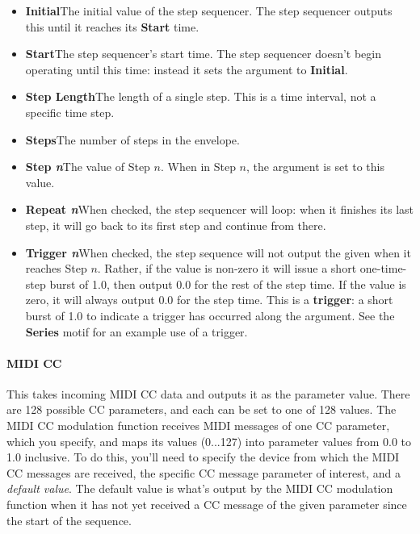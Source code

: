 \documentclass[twoside,10pt]{article}
\begin{document}
\begin{itemize}
\item {\bf Initial}\qquad The initial value of the step sequencer.   The step sequencer outputs this until it reaches its {\bf Start} time.
\item {\bf Start}\qquad The step sequencer's start time.  The step sequencer doesn't begin operating until this time: instead it sets the argument to {\bf Initial}.
\item {\bf Step Length}\qquad The length of a single step.  This is a time interval, not a specific time step.
\item {\bf Steps}\qquad The number of steps in the envelope.
\item {\bf Step \textit{n}}\qquad The value of Step \(n\).  When in Step \(n\), the argument is set to this value.
\item {\bf Repeat \textit{n}}\qquad When checked, the step sequencer will loop: when it finishes its last step, it will go back to its first step and continue from there.
\item {\bf Trigger \textit{n}}\qquad When checked, the step sequence will not output the given when it reaches Step \(n\).  Rather, if the value is non-zero it will issue a short one-time-step burst of 1.0, then output 0.0 for the rest of the step time.  If the value is zero, it will always output 0.0 for the step time.  This is a {\bf trigger}: a short burst of 1.0 to indicate a trigger has occurred along the argument.  See the {\bf Series} motif for an example use of a trigger.
\end{itemize}

\paragraph{MIDI CC}

This takes incoming MIDI CC data and outputs it as the parameter value.  There are 128 possible CC parameters, and each can be set to one of 128 values.  The MIDI CC modulation function receives MIDI messages of one CC parameter, which you specify, and maps its values (0...127) into parameter values from 0.0 to 1.0 inclusive.  To do this, you'll need to specify the device from which the MIDI CC messages are received, the specific CC message parameter of interest, and a {\it default value}.  The default value is what's output by the MIDI CC modulation function when it has not yet received a CC message of the given parameter since the start of the sequence.
\end{document}
